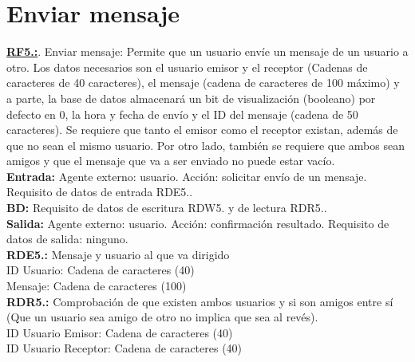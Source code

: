  \setcounter{RDW}{1}
 \setcounter{RDR}{1}
 \setcounter{RDE}{1}
 \setcounter{RDS}{1}
 \setcounter{RF}{1}

\section{Enviar mensaje}
\textbf{\textcolor{rojo}{\underline{RF5.\theRF:}}}. Enviar mensaje: Permite que un usuario envíe un mensaje de un usuario a otro. Los datos necesarios son el usuario 
emisor y el receptor (Cadenas de caracteres de 40 caracteres), el mensaje (cadena de caracteres de 100 máximo) y a parte, la base de datos almacenará un bit de 
visualización (booleano) por defecto en 0, la hora y fecha de envío y el ID del mensaje (cadena de 50 caracteres). Se requiere que tanto el emisor como el 
receptor existan, además de que no sean el mismo usuario. Por otro lado, también se requiere que ambos sean amigos y que el mensaje que va a ser enviado no 
puede estar vacío.\\[1pt]

\textbf{\textcolor{rojo}{Entrada:}} Agente externo: usuario. Acción: solicitar envío de un mensaje. 
Requisito de datos de entrada \textcolor{azul}{RDE5.\theRDE}. \\[6pt]

\textbf{\textcolor{rojo}{BD:}} Requisito de datos de escritura \textcolor{azul}{RDW5.\theRDW} y de lectura \textcolor{azul}{RDR5.\theRDR}. \\[6pt]

\textbf{\textcolor{rojo}{Salida:}} Agente externo: usuario. Acción: confirmación resultado. 
Requisito de datos de salida: ninguno. \\[12pt]

\textcolor{azul}{\textbf{RDE5.\theRDE:}} Mensaje y usuario al que va dirigido \\
\hspace*{1cm} ID Usuario: Cadena de caracteres (40) \\
\hspace*{1cm} Mensaje: Cadena de caracteres (100) \\[12pt]

\textcolor{azul}{\textbf{RDR5.\theRDR:}} Comprobación de que existen ambos usuarios y si son amigos entre sí (Que un usuario sea amigo de otro no implica que sea al revés). \\
\hspace*{1cm} ID Usuario Emisor: Cadena de caracteres (40) \\
\hspace*{1cm} ID Usuario Receptor: Cadena de caracteres (40) \\[12pt]

